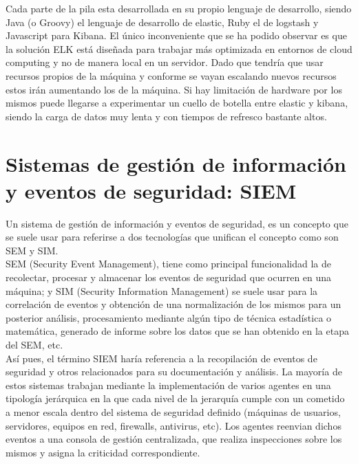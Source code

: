 Cada parte de la pila esta desarrollada en su propio lenguaje de desarrollo, siendo Java (o Groovy) el lenguaje de desarrollo de elastic, Ruby el de logstash y Javascript para Kibana. El único inconveniente que se ha podido observar es que la solución ELK está diseñada para trabajar más optimizada en entornos de cloud computing y no de manera local en un servidor. Dado que tendría que usar recursos propios de la máquina y conforme se vayan escalando nuevos recursos estos irán aumentando los de la máquina. Si hay limitación de hardware por los mismos puede llegarse a experimentar un cuello de botella entre elastic y kibana, siendo la carga de datos muy lenta y con tiempos de refresco bastante altos. \\

\section[SIEM]{Sistemas de gestión de información y eventos de seguridad: SIEM}

Un sistema de gestión de información y eventos de seguridad, es un concepto que se suele usar para referirse a dos tecnologías que unifican el concepto como son SEM y SIM. \\

SEM (Security Event Management), tiene como principal funcionalidad la de recolectar, procesar y almacenar los eventos de seguridad que ocurren en una máquina; y SIM (Security Information Management) se suele usar para la correlación de eventos y obtención de una normalización de los mismos para un posterior análisis, procesamiento mediante algún tipo de técnica estadística o matemática, generado de informe sobre los datos que se han obtenido en la etapa del SEM, etc. \\

Así pues, el término SIEM haría referencia a la recopilación de eventos de seguridad y otros relacionados para su documentación y análisis. La mayoría de estos sistemas trabajan mediante la implementación de varios agentes en una tipología jerárquica en la que cada nivel de la jerarquía cumple con un cometido a menor escala dentro del sistema de seguridad definido (máquinas de usuarios, servidores, equipos en red, firewalls, antivirus, etc). Los agentes reenvian dichos eventos a una consola de gestión centralizada, que realiza inspecciones sobre los mismos y asigna la criticidad correspondiente. \\

